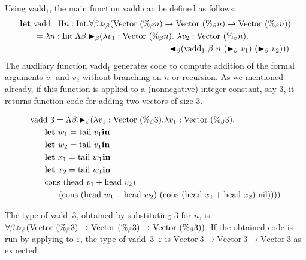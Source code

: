 Using vadd$_1$, the main function vadd can be defined as follows:
\renewcommand{\Vpn}{\text{Vector}\ (\%_\beta n)}
\begin{align*}
	  & \textbf{let}\ \text{vadd}: \Pi n:\I.\F\beta.\TW_\beta(\Vpn\to\Vpn\to\Vpn)                \\ 
	  & \hspace{6mm} = \lambda n:\I.\Lambda\beta.\TB_\beta (\lambda v_1:\Vpn.\ \lambda v_2:\Vpn. \\
	  & \hspace{63mm} \TBL_\beta (\text{vadd}_1\ \beta\ n\ (\TB_\beta\ v_1)\ (\TB_\beta\ v_2))) 
\end{align*}
\renewcommand{\Vpn}{\text{Vector}\ (\%_\beta 3)}%
The auxiliary function vadd$_1$ generates code to compute addition of
the formal arguments $v_1$ and $v_2$ without branching on $n$ or recursion.
As we mentioned already, if this function is applied to a
(nonnegative) integer constant, say 3, it returns function code for adding
two vectors of size 3. 

\begin{align*}
    & \text{vadd 3} = \Lambda\beta. \TB_\beta (\lambda v_1:\text{Vector } (\%_\beta 3). \lambda v_1:\text{Vector } (\%_\beta 3). \\
    & \hspace{6mm} \textbf{let}\ w_1 = \text{tail}\ v_1 \textbf{in} \\
    & \hspace{6mm} \textbf{let}\ w_2 = \text{tail}\ v_1 \textbf{in} \\
    & \hspace{6mm} \textbf{let}\ x_1 = \text{tail}\ w_1 \textbf{in} \\
    & \hspace{6mm} \textbf{let}\ x_2 = \text{tail}\ w_1 \textbf{in} \\
    & \hspace{6mm} \text{cons (head } v_1 + \text{head } v_2)\ \\
    & \hspace{12mm} \text{(cons (head } w_1 + \text{head } w_2)\ \text{(cons (head } x_1 + \text{head } x_2) \text{ nil})))
    )
\end{align*}

The type of vadd\ 3, obtained by substituting 3 for $n$, is \\
\({ \F\beta.\TW_\beta(\Vpn\to\Vpn\to\Vpn) }\). 
\renewcommand{\Vpn}{\text{Vector}\ 3}
If the obtained code is run by applying to \(\varepsilon\), the type of
vadd\ 3\ \(\varepsilon\) is \(\Vpn\to\Vpn\to\Vpn\) as expected.

